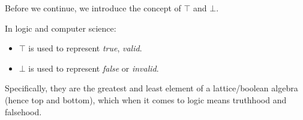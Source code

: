 \newpage 

\noindent
Before we continue, we introduce the concept of $\top$ and $\bot$.

\begin{Def}
    
    In logic and computer science:
    \begin{itemize}
        \item $\top$ is used to represent \textit{true}, \textit{valid}.
        \item $\bot$ is used to represent \textit{false} or \textit{invalid}.
    \end{itemize}

    \noindent
    Specifically, they are the greatest and least element of a lattice/boolean algebra (hence top and bottom), which when it comes to logic means truthhood and falsehood.
\end{Def}

